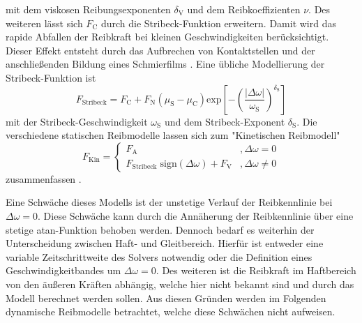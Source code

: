 mit dem viskosen Reibungsexponenten $\delta_\mathrm{V}$ und dem Reibkoeffizienten $\nu$. Des weiteren lässt sich $F_\mathrm{C}$ durch die Stribeck-Funktion erweitern. Damit wird das rapide Abfallen der Reibkraft bei kleinen Geschwindigkeiten berücksichtigt. Dieser Effekt entsteht durch das Aufbrechen von Kontaktstellen und der anschließenden Bildung eines Schmierfilms \cite{Stribeck.1903}. Eine übliche Modellierung der Stribeck-Funktion ist
\begin{equation}
F_\mathrm{Stribeck} = F_\mathrm{C} + F_\mathrm{N}(\mu_\mathrm{S}-\mu_\mathrm{C})\mathrm{exp}\left[-\left(\frac{\vert\Delta \omega \vert}{\omega_\mathrm{S}}\right)^{\delta_\mathrm{S}}\right]
\end{equation} 
mit der Stribeck-Geschwindigkeit $\omega_\mathrm{S}$ und dem Stribeck-Exponent $\delta_\mathrm{S}$. Die verschiedene statischen Reibmodelle lassen sich zum "Kinetischen Reibmodell" 
\begin{equation}
F_\mathrm{Kin} = \begin{cases}F_\mathrm{A} &,\Delta \omega=0 \\
 F_\mathrm{Stribeck}\; \mathrm{sign}(\Delta \omega)+F_\mathrm{V} &, \Delta \omega \neq 0\end{cases}
\end{equation}
zusammenfassen \cite{Altpeter.1999}.

Eine Schwäche dieses Modells ist der unstetige Verlauf der Reibkennlinie bei $\Delta \omega=0$. Diese Schwäche kann durch die Annäherung der Reibkennlinie über eine stetige atan-Funktion behoben werden. Dennoch bedarf es weiterhin der Unterscheidung zwischen Haft- und Gleitbereich. Hierfür ist entweder eine variable Zeitschrittweite des Solvers notwendig oder die Definition eines Geschwindigkeitbandes um $\Delta\omega=0$. Des weiteren ist die Reibkraft im Haftbereich von den äußeren Kräften abhängig, welche hier nicht bekannt sind und durch das Modell berechnet werden sollen. Aus diesen Gründen werden im Folgenden dynamische Reibmodelle betrachtet, welche diese Schwächen nicht aufweisen. 

